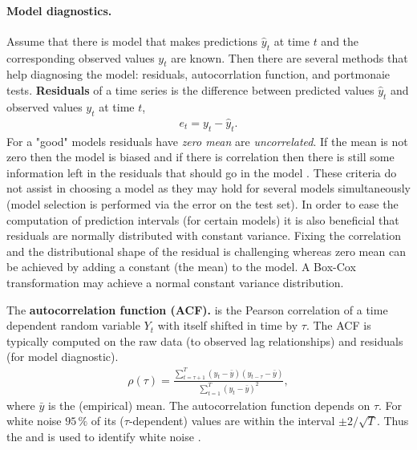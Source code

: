 \documentclass[12pt,a4paper]{article}
\begin{document}
\paragraph{Model diagnostics.} Assume that there is model that makes predictions  $\hat y_t$ at time $t$ and the corresponding observed values $y_t$ are known. Then there are several methods that help diagnosing the model: residuals, autocorrlation function, and portmonaie tests. 
\textbf{Residuals} of a time series is the difference between predicted values $\hat y_t$ and observed values  $y_t$ at time $t$, 
\begin{align}
	e_t = y_t - \hat y_t.
\end{align}
For a  "good" models residuals  have \textit{zero mean}  are \textit{uncorrelated}. If the mean is not zero then the model is biased and if there is correlation then there is still some information left in the residuals that should go in the model \cite{hyndman_forecasting_principles_2018}. These criteria do not assist in choosing a model as they may hold for several models simultaneously (model selection is performed via the error on the test set). In order to ease the computation of prediction intervals (for certain models) it is also beneficial that residuals are normally distributed with constant variance. Fixing the correlation and the distributional shape of the residual is challenging whereas zero mean can be achieved by adding a constant (the mean) to the model. A Box-Cox transformation may achieve a normal constant variance distribution.


The \textbf{autocorrelation function (ACF).} is the Pearson correlation of a time dependent random variable $Y_t$ with itself shifted in time by $\tau$. The ACF is typically computed on the raw data (to observed lag relationships) and residuals (for model diagnostic).
\begin{align}
	\rho(\tau) =  \frac {\sum_{t=\tau+1} ^ T  \left(y_t - \bar y\right) \left(y_{t-\tau} - \bar y\right) }{\sum_{t=1} ^ T (y_t - \bar y)^2 },
\end{align}
where $\bar y$ is the (empirical) mean. The autocorrelation function depends on $\tau$. For white noise $95\,\%$ of its ($\tau$-dependent) values are within the interval $\pm2/\sqrt{T}$. Thus the  and is used to identify white noise \cite{hyndman_forecasting_principles_2018}. 
\end{document}
